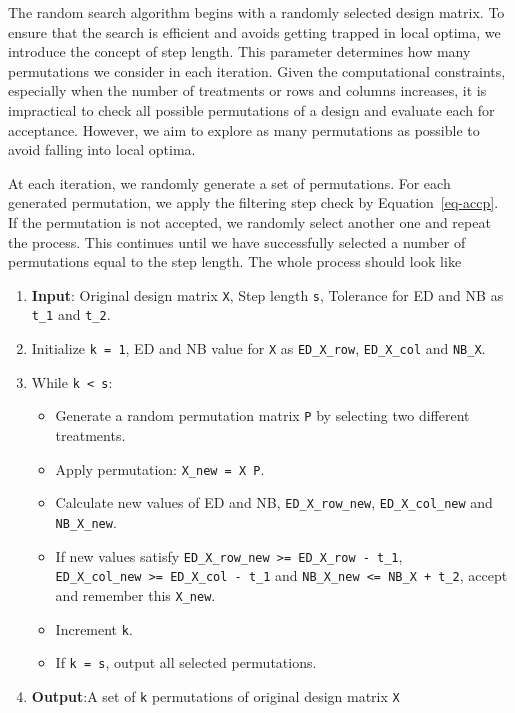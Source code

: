 \documentclass[
  a4paper,
  oneside,
  openany,
  12pt,
  onecolumn]{book}
\providecommand{\tightlist}{%
  \setlength{\itemsep}{0pt}\setlength{\parskip}{0pt}}\usepackage{longtable,booktabs,array}
\theoremstyle{plain}
\theoremstyle{definition}
\theoremstyle{remark}
\begin{document}
The random search algorithm begins with a randomly selected design
matrix. To ensure that the search is efficient and avoids getting
trapped in local optima, we introduce the concept of step length. This
parameter determines how many permutations we consider in each
iteration. Given the computational constraints, especially when the
number of treatments or rows and columns increases, it is impractical to
check all possible permutations of a design and evaluate each for
acceptance. However, we aim to explore as many permutations as possible
to avoid falling into local optima.

At each iteration, we randomly generate a set of permutations. For each
generated permutation, we apply the filtering step check by
Equation~\ref{eq-accp}. If the permutation is not accepted, we randomly
select another one and repeat the process. This continues until we have
successfully selected a number of permutations equal to the step length.
The whole process should look like

\begin{enumerate}
\def\labelenumi{\arabic{enumi}.}
\tightlist
\item
  \textbf{Input}: Original design matrix \texttt{X}, Step length
  \texttt{s}, Tolerance for ED and NB as \texttt{t\_1} and
  \texttt{t\_2}.
\item
  Initialize \texttt{k\ =\ 1}, ED and NB value for \texttt{X} as
  \texttt{ED\_X\_row}, \texttt{ED\_X\_col} and \texttt{NB\_X}.
\item
  While \texttt{k\ \textless{}\ s}:

  \begin{itemize}
  \tightlist
  \item
    Generate a random permutation matrix \texttt{P} by selecting two
    different treatments.
  \item
    Apply permutation: \texttt{X\_new\ =\ X\ P}.
  \item
    Calculate new values of ED and NB, \texttt{ED\_X\_row\_new},
    \texttt{ED\_X\_col\_new} and \texttt{NB\_X\_new}.
  \item
    If new values satisfy
    \texttt{ED\_X\_row\_new\ \textgreater{}=\ ED\_X\_row\ -\ t\_1},
    \texttt{ED\_X\_col\_new\ \textgreater{}=\ ED\_X\_col\ -\ t\_1} and
    \texttt{NB\_X\_new\ \textless{}=\ NB\_X\ +\ t\_2}, accept and
    remember this \texttt{X\_new}.
  \item
    Increment \texttt{k}.
  \item
    If \texttt{k\ =\ s}, output all selected permutations.
  \end{itemize}
\item
  \textbf{Output}:A set of \texttt{k} permutations of original design
  matrix \texttt{X}
\end{enumerate}
\end{document}
